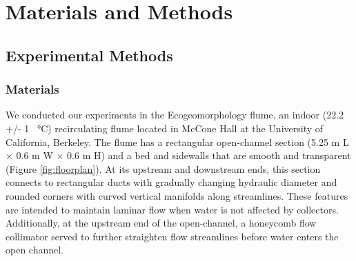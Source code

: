 \documentclass[geosciences,article,submit,moreauthors,pdftex]{Definitions/mdpi}
\begin{document}
\section{Materials and Methods}

\subsection{Experimental Methods}

\subsubsection{Materials}

We conducted our experiments in the Ecogeomorphology flume, an indoor (22.2 +/- 1 \SI{}{\celsius}) recirculating flume located in McCone Hall at the University of California, Berkeley. The flume has a rectangular open-channel section (5.25 m L $\times$ 0.6 m W $\times$ 0.6 m H) and a bed and sidewalls that are smooth and transparent (Figure \ref{fig:floorplan}). At its upstream and downstream ends, this section connects to rectangular ducts with gradually changing hydraulic diameter and rounded corners with curved vertical manifolds along streamlines. These features are intended to maintain laminar flow when water is not affected by collectors. Additionally, at the upstream end of the open-channel, a honeycomb flow collimator served to further straighten flow streamlines before water enters the open channel. 
\end{document}
